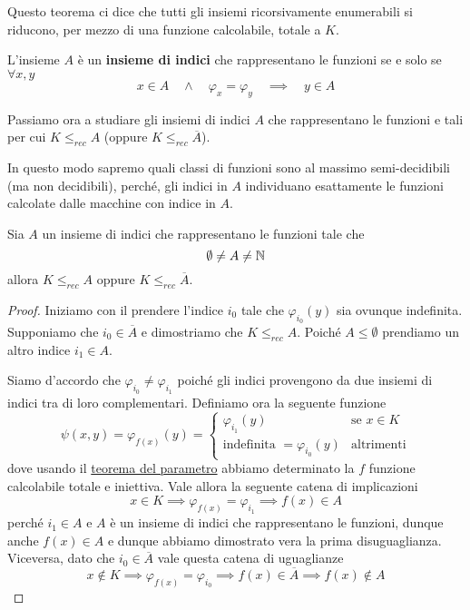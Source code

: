 Questo teorema ci dice che tutti gli insiemi ricorsivamente
enumerabili si riducono, per mezzo di una funzione calcolabile,
totale a $K$.

\begin{definition}
	L'insieme $A$ è un \textbf{insieme di indici} che
	rappresentano le funzioni se e solo se $\forall x, y$
	\[
		x \in A \quad \land \quad \varphi_x = \varphi_y
		\quad \implies \quad y \in A
	\]
\end{definition}

Passiamo ora a studiare gli insiemi di indici $A$ che
rappresentano le funzioni e tali per cui $K \leq_{rec} A$ (oppure
$K \leq_{rec} \overline{A}$).

In questo modo sapremo quali classi di funzioni sono al massimo
semi-decidibili (ma non decidibili), perché, gli indici in $A$
individuano esattamente le funzioni calcolate dalle macchine con
indice in $A$.

\begin{theorem} \label{th: indici}
	Sia $A$ un insieme di indici che rappresentano le funzioni
	tale che
	\[ \emptyset \neq A \neq \mathbb{N} \]
	allora $K \leq_{rec} A$ oppure $K \leq_{rec} \overline{A}$.
	\begin{proof}
		Iniziamo con il prendere l'indice $i_0$ tale che
		$\varphi_{i_0}(y)$ sia ovunque indefinita. Supponiamo
		che $i_0 \in \overline{A}$ e dimostriamo che
		$K \leq_{rec} A$. Poiché $A \leq \emptyset$ prendiamo un
		altro indice $i_1 \in A$.

		Siamo d'accordo che $\varphi_{i_0} \neq \varphi_{i_1}$
		poiché gli indici provengono da due insiemi di indici
		tra di loro complementari. Definiamo ora la seguente
		funzione
		\[
			\psi (x, y) = \varphi_{f(x)} (y) = \begin{cases}
				\varphi_{i_1} (y)                      & \text{se } x \in K \\
				\text{indefinita } = \varphi_{i_0} (y) & \text{altrimenti}
			\end{cases}
		\]
		dove usando il \hyperref[th: s-m-n]{teorema del parametro}
		abbiamo determinato la $f$ funzione calcolabile totale e
		iniettiva. Vale allora la seguente catena di implicazioni
		\[
			x \in K \implies \varphi_{f(x)} = \varphi_{i_1}
			\implies f(x) \in A
		\]
		perché $i_1 \in A$ e $A$ è un insieme di indici che
		rappresentano le funzioni, dunque anche $f(x) \in A$ e
		dunque abbiamo dimostrato vera la prima disuguaglianza.
		Viceversa, dato che $i_0 \in \overline{A}$ vale questa
		catena di uguaglianze
		\[
			x \notin K \implies \varphi_{f(x)} = \varphi_{i_0}
			\implies f(x) \in \overline{A} \implies f(x) \notin A
		\]
	\end{proof}
\end{theorem}

